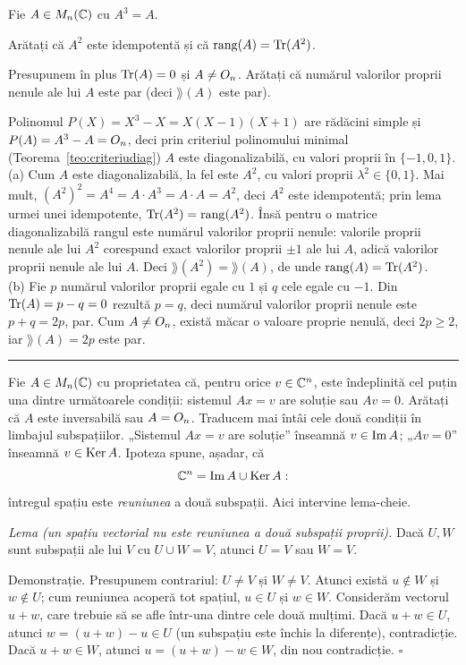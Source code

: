Fie $A\in M_n(\mathbb{C})$ cu $A^3=A$.
\begin{parti}
  \item Arătați că $A^2$ este idempotentă și că $\operatorname{rang}(A)=\operatorname{Tr}(A^2)$.
  \item Presupunem în plus $\operatorname{Tr}(A)=0$ și $A\neq O_n$. Arătați că numărul valorilor proprii nenule ale lui $A$ este par (deci $\rang(A)$ este par).
\end{parti}
\sol Polinomul $P(X)=X^3-X=X(X-1)(X+1)$ are rădăcini simple și $P(A)=A^3-A=O_n$, deci prin criteriul polinomului minimal (Teorema~\ref{teo:criteriudiag}) $A$ este diagonalizabilă, cu valori proprii în $\{-1,0,1\}$.\\[2pt]
(a) Cum $A$ este diagonalizabilă, la fel este $A^2$, cu valori proprii $\lambda^2\in\{0,1\}$. Mai mult, $(A^2)^2=A^4=A\cdot A^3=A\cdot A=A^2$, deci $A^2$ este idempotentă; prin lema urmei unei idempotente, $\operatorname{Tr}(A^2)=\operatorname{rang}(A^2)$. Însă pentru o matrice diagonalizabilă rangul este numărul valorilor proprii nenule: valorile proprii nenule ale lui $A^2$ corespund exact valorilor proprii $\pm1$ ale lui $A$, adică valorilor proprii nenule ale lui $A$. Deci $\rang(A^2)=\rang(A)$, de unde $\operatorname{rang}(A)=\operatorname{Tr}(A^2)$.\\[2pt]
(b) Fie $p$ numărul valorilor proprii egale cu $1$ și $q$ cele egale cu $-1$. Din $\operatorname{Tr}(A)=p-q=0$ rezultă $p=q$, deci numărul valorilor proprii nenule este $p+q=2p$, par. Cum $A\neq O_n$, există măcar o valoare proprie nenulă, deci $2p\ge2$, iar $\rang(A)=2p$ este par.
\vspace{1mm}\hrule

Fie $A \in M_n(\mathbb{C})$ cu proprietatea că, pentru orice $v \in \mathbb{C}^n$, este îndeplinită cel puțin una dintre următoarele condiții: sistemul $Ax = v$ are soluție sau $Av = 0$. Arătați că $A$ este inversabilă sau $A = O_n$.
\sol Traducem mai întâi cele două condiții în limbajul subspațiilor. „Sistemul $Ax = v$ are soluție'' înseamnă $v \in \operatorname{Im} A$; „$Av = 0$'' înseamnă $v \in \operatorname{Ker} A$. Ipoteza spune, așadar, că
\[
\mathbb{C}^n = \operatorname{Im} A \cup \operatorname{Ker} A :
\]
întregul spațiu este \emph{reuniunea} a două subspații. Aici intervine lema-cheie.

\medskip
\emph{Lema (un spațiu vectorial nu este reuniunea a două subspații proprii).} Dacă $U, W$ sunt subspații ale lui $V$ cu $U \cup W = V$, atunci $U = V$ sau $W = V$.

\medskip
Demonstrație. Presupunem contrariul: $U \neq V$ și $W \neq V$. Atunci există $u \notin W$ și $w \notin U$; cum reuniunea acoperă tot spațiul, $u \in U$ și $w \in W$. Considerăm vectorul $u + w$, care trebuie să se afle într-una dintre cele două mulțimi. Dacă $u + w \in U$, atunci $w = (u + w) - u \in U$ (un subspațiu este închis la diferențe), contradicție. Dacă $u + w \in W$, atunci $u = (u + w) - w \in W$, din nou contradicție. $\square$


